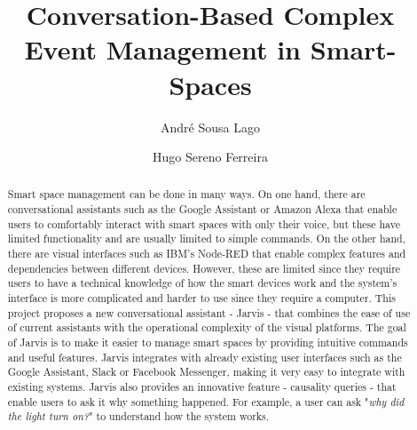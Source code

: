 \documentclass[runningheads]{llncs}
\begin{document}
%
\title{Conversation-Based Complex Event Management in Smart-Spaces}
%
%
\author{André Sousa Lago \and
Hugo Sereno Ferreira}
%
%
%
\maketitle              %
%
\begin{abstract}
    Smart space management can be done in many ways. On one hand, there are conversational assistants such as the Google Assistant or Amazon Alexa that enable users to comfortably interact with smart spaces with only their voice, but these have limited functionality and are usually limited to simple commands. On the other hand, there are visual interfaces such as IBM's Node-RED that enable complex features and dependencies between different devices. However, these are limited since they require users to have a technical knowledge of how the smart devices work and the system's interface is more complicated and harder to use since they require a computer.
    This project proposes a new conversational assistant - Jarvis - that combines the ease of use of current assistants with the operational complexity of the visual platforms. The goal of Jarvis is to make it easier to manage smart spaces by providing intuitive commands and useful features. Jarvis integrates with already existing user interfaces such as the Google Assistant, Slack or Facebook Messenger, making it very easy to integrate with existing systems. Jarvis also provides an innovative feature - causality queries - that enable users to ask it why something happened. For example, a user can ask "\textit{why did the light turn on?}" to understand how the system works.

\end{abstract}
%
%
%
\end{document}

